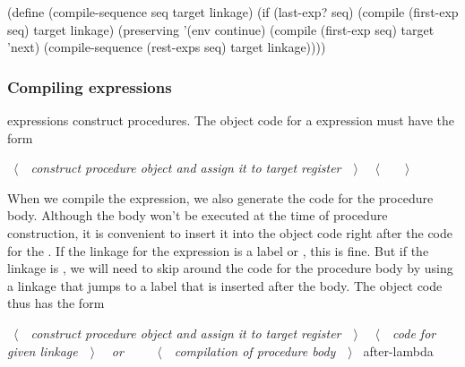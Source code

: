 \begin{codeBlock}
(define (compile-sequence seq
                          target
                          linkage)
  (if (last-exp? seq)
      (compile (first-exp seq)
               target
               linkage)
      (preserving
        '(env continue)
        (compile (first-exp seq)
                 target
                 'next)
        (compile-sequence (rest-exps seq)
                          target
                          linkage))))
\end{codeBlock}

\subsubsection*{Compiling  expressions}

 expressions construct procedures.  The object code for a
 expression must have the form

\begin{codeBlock}
~\(\langle \)~~\emph{construct procedure object and assign it to target register}~~\(\rangle \)~
~\(\langle \)~~~~\(\rangle \)~
\end{codeBlock}

\noindent
When we compile the  expression, we also generate the code for the
procedure body.  Although the body won't be executed at the time of procedure
construction, it is convenient to insert it into the object code right after
the code for the .  If the linkage for the 
expression is a label or , this is fine.  But if the linkage is
, we will need to skip around the code for the procedure body by
using a linkage that jumps to a label that is inserted after the body.  The
object code thus has the form

\begin{codeBlock}
~\(\langle \)~~\emph{construct procedure object and assign it to target register}~~\(\rangle \)~
 ~\(\langle \)~~\emph{code for given linkage}~~\(\rangle \)~ ~\emph{or}~ ~~
 ~\(\langle \)~~\emph{compilation of procedure body}~~\(\rangle \)~
after-lambda
\end{codeBlock}


